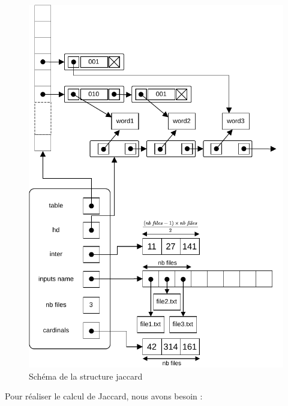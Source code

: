 \documentclass[a4paper, 12pt]{article}
\begin{document}
\begin{figure}[H]
\centering
\begin{tcolorbox}[enhanced,
colback=white,
colframe=codeblue,
fonttitle=\bfseries,
title=Schéma,
boxrule=2pt,
width=0.8\textwidth]
\includegraphics[width=\textwidth]{jaccard_schema.pdf}
\end{tcolorbox}
\caption{Schéma de la structure jaccard}
\label{fig:jaccard_shema}
\end{figure}

Pour réaliser le calcul de Jaccard, nous avons besoin : 
\end{document}
